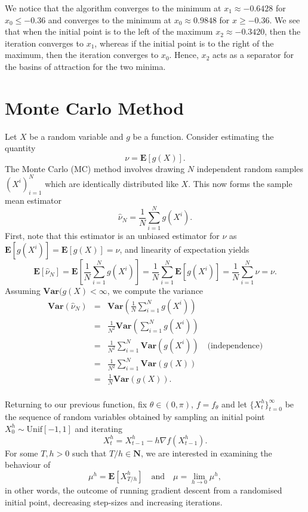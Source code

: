 \documentclass{article}
\begin{document}
We notice that the algorithm converges to the minimum at \(x_1 \approx -0.6428\) for \(x_0 \leq -0.36\) and converges to the minimum at \(x_0 \approx 0.9848\) for \(x \geq -0.36\). We see that when the initial point is to the left of the maximum \(x_2 \approx -0.3420\), then the iteration converges to \(x_1\), whereas if the initial point is to the right of the maximum, then the iteration converges to \(x_0\). Hence, \(x_2\) acts as a separator for the basins of attraction for the two minima.

\section{Monte Carlo Method}

Let \(X\) be a random variable and \(g\) be a function. Consider estimating the quantity
\[ \nu = \mathbf{E}[g(X)]. \]
The Monte Carlo (MC) method involves drawing \(N\) independent random samples \((X^i)_{i=1}^N\) which are identically distributed like \(X\). This now forms the sample mean estimator
\[ \hat\nu_N = \frac{1}{N}\sum_{i=1}^N g(X^i). \]
First, note that this estimator is an unbiased estimator for \(\nu\) as \(\mathbf{E}[g(X^i)] = \mathbf{E}[g(X)] = \nu\), and linearity of expectation yields
\[ \mathbf{E}[\hat\nu_N] = \mathbf{E}\left[\frac{1}{N}\sum_{i=1}^N g(X^i)\right] = \frac{1}{N}\sum_{i=1}^N\mathbf{E}[ g(X^i)] = \frac{1}{N}\sum_{i=1}^N \nu = \nu. \]
Assuming \(\mathbf{Var}(g(X) < \infty\), we compute the variance
\begin{eqnarray*}
    \mathbf{Var}(\hat\nu_N) & = & \mathbf{Var}\left(\frac{1}{N}\sum_{i=1}^N g(X^i)\right) \\
                            & = & \frac{1}{N^2}\mathbf{Var}\left(\sum_{i=1}^N g(X^i)\right) \\
                            & = &  \frac{1}{N^2}\sum_{i=1}^N\mathbf{Var}( g(X^i)) \quad \mbox{(independence)} \\
                            & = &  \frac{1}{N^2}\sum_{i=1}^N\mathbf{Var}( g(X)) \\
                            & = &  \frac{1}{N}\mathbf{Var}( g(X)). \\
\end{eqnarray*}

Returning to our previous function, fix \(\theta \in (0, \pi)\), \(f = f_\theta\) and let \(\{X^h_t\}_{t=0}^\infty\) be the sequence of random variables obtained by sampling an initial point \(X_0^h \sim \mathrm{Unif}[-1, 1]\) and iterating 
\[ X^h_t = X^h_{t-1} - h\nabla f(X^h_{t-1}). \]
For some \(T, h > 0\) such that \(T / h \in \mathbf{N}\), we are interested in examining the behaviour of
\[ \mu^h = \mathbf{E}[X^h_{T/h}] \quad \mbox{and} \quad \mu = \lim_{h \to 0} \mu^h, \]
in other words, the outcome of running gradient descent from a randomised initial point, decreasing step-sizes and increasing iterations. 
\end{document}
